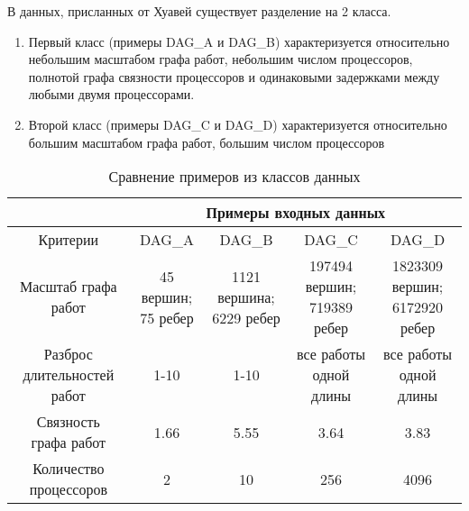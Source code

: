 В данных, присланных от Хуавей существует разделение на 2 класса.
\begin{enumerate}
    \item Первый класс (примеры DAG\_A и DAG\_B) характеризуется относительно небольшим масштабом графа работ, небольшим числом процессоров, полнотой графа связности процессоров и одинаковыми задержками между любыми двумя процессорами.
    \item Второй класс (примеры DAG\_C и DAG\_D) характеризуется относительно большим масштабом графа работ, большим числом процессоров
\end{enumerate}
\begin{table}[!htbp]
    \caption{Сравнение примеров из классов данных}
    \begin{tabular}{c|c|c|c|c}
                            & \multicolumn{4}{c}{Примеры входных данных}                            \\
        \hline
        Критерии            & DAG\_A                                     & DAG\_B & DAG\_C & DAG\_D \\
        \hline
        Масштаб графа работ & \makecell{45 вершин;                                                  \\75 ребер}                        & \makecell{1121 вершина;\\6229 ребер} & \makecell{197494 вершин;\\719389 ребер} & \makecell{1823309 вершин;\\6172920 ребер} \\
        \hline
        \makecell{Разброс                                                                           \\длительностей работ}            & 1-10                                       & 1-10   & \makecell{все работы\\одной длины} & \makecell{все работы\\одной длины} \\
        \hline
        \makecell{Связность                                                                         \\графа работ}                  & 1.66                                       & 5.55   & 3.64                   & 3.83                   \\
        \hline
        \makecell{Количество                                                                        \\процессоров}                 & 2                                          & 10     & 256                    & 4096                   \\

\end{tabular}
\end{table}
